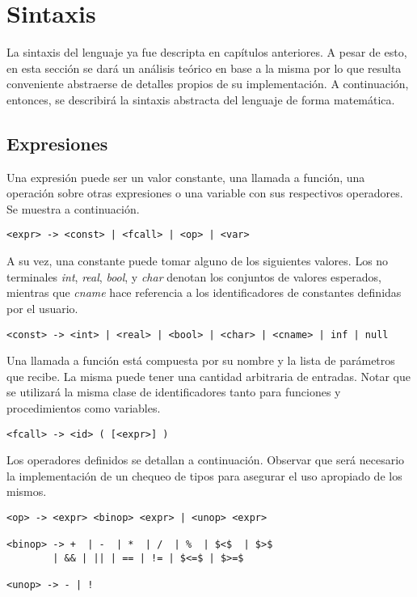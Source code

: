 \documentclass{article}
\begin{document}
\section{Sintaxis}

La sintaxis del lenguaje ya fue descripta en capítulos anteriores.
A pesar de esto, en esta sección se dará un análisis teórico en base a la misma por lo que resulta conveniente abstraerse de detalles propios de su implementación.
A continuación, entonces, se describirá la sintaxis abstracta del lenguaje de forma matemática.

\subsection{Expresiones}

Una expresión puede ser un valor constante, una llamada a función, una operación sobre otras expresiones o una variable con sus respectivos operadores.
Se muestra a continuación.

\begin{lstlisting}[style = syntax]
<expr> -> <const> | <fcall> | <op> | <var>
\end{lstlisting}

A su vez, una constante puede tomar alguno de los siguientes valores.
Los no terminales \textit{int}, \textit{real}, \textit{bool}, y \textit{char} denotan los conjuntos de valores esperados, mientras que \textit{cname} hace referencia a los identificadores de constantes definidas por el usuario.

\begin{lstlisting}[style = syntax]
<const> -> <int> | <real> | <bool> | <char> | <cname> | inf | null
\end{lstlisting}

Una llamada a función está compuesta por su nombre y la lista de parámetros que recibe.
La misma puede tener una cantidad arbitraria de entradas.
Notar que se utilizará la misma clase de identificadores tanto para funciones y procedimientos como variables.

\begin{lstlisting}[style = syntax]
<fcall> -> <id> ( [<expr>] )
\end{lstlisting}

Los operadores definidos se detallan a continuación.
Observar que será necesario la implementación de un chequeo de tipos para asegurar el uso apropiado de los mismos.

\begin{lstlisting}[style = syntax]
<op> -> <expr> <binop> <expr> | <unop> <expr>

<binop> -> +  | -  | *  | /  | %  | $<$  | $>$ 
        | && | || | == | != | $<=$ | $>=$ 

<unop> -> - | !
\end{lstlisting}
\end{document}
